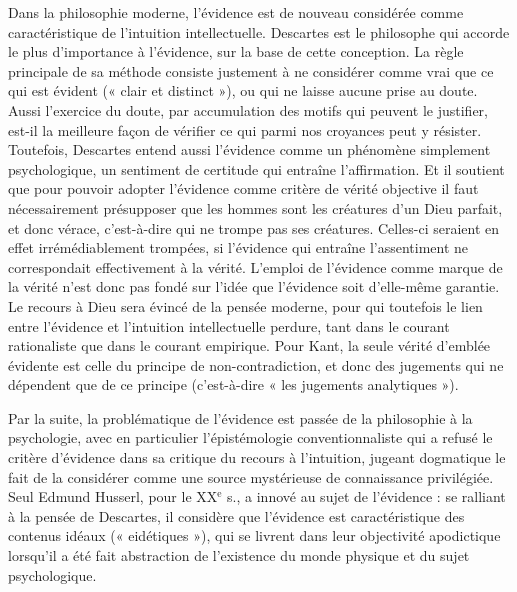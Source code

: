 Dans la philosophie moderne, l’évidence
est de nouveau considérée comme
caractéristique de l'intuition intellectuelle.
Descartes est le philosophe qui accorde le
plus d'importance à l’évidence, sur la base
de cette conception. La règle principale
de sa méthode consiste justement à ne
considérer comme vrai que ce qui est évident
(« clair et distinct »), ou qui ne laisse
aucune prise au doute. Aussi l’exercice du
doute, par accumulation des motifs qui
peuvent le justifier, est-il la meilleure
façon de vérifier ce qui parmi nos
croyances peut y résister. Toutefois, Descartes
entend aussi l'évidence comme un
phénomène simplement psychologique,
un sentiment de certitude qui entraîne
l'affirmation. Et il soutient que pour pouvoir
adopter l'évidence comme critère de
vérité objective il faut nécessairement
présupposer que les hommes sont les
créatures d’un Dieu parfait, et donc
vérace, c’est-à-dire qui ne trompe pas ses
créatures. Celles-ci seraient en effet irrémédiablement
trompées, si l’évidence qui
entraîne l’assentiment ne correspondait
effectivement à la vérité. L'emploi de
l'évidence comme marque de la vérité
n’est donc pas fondé sur l’idée que l’évidence
soit d’elle-même garantie. Le
recours à Dieu sera évincé de la pensée
moderne, pour qui toutefois le lien entre
l'évidence et l'intuition intellectuelle perdure,
tant dans le courant rationaliste que
dans le courant empirique. Pour Kant, la
seule vérité d'emblée évidente est celle du
principe de non-contradiction, et donc des
jugements qui ne dépendent que de ce
principe (c’est-à-dire « les jugements analytiques »).

Par la suite, la problématique de l’évidence
est passée de la philosophie à la
psychologie, avec en particulier l’épistémologie
conventionnaliste qui a refusé le
critère d’évidence dans sa critique du
recours à l’intuition, jugeant dogmatique
le fait de la considérer comme une source
mystérieuse de connaissance privilégiée.
Seul Edmund Husserl, pour le {\footnotesize XX}$^\text{e}$ s., a
innové au sujet de l'évidence : se ralliant
à la pensée de Descartes, il considère que
l'évidence est caractéristique des contenus
idéaux (« eidétiques »), qui se livrent
dans leur objectivité apodictique lorsqu'il
a été fait abstraction de l’existence du
monde physique et du sujet psychologique.
